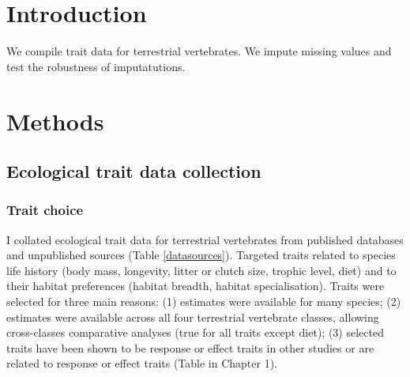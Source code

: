 \section{Introduction}
We compile trait data for terrestrial vertebrates. We impute missing values and test the robustness of imputatutions.


\section{Methods}

\subsection{Ecological trait data collection}

\subsubsection{Trait choice}
I collated ecological trait data for terrestrial vertebrates from published databases and unpublished sources (Table \ref{datasources}). Targeted traits related to species life history (body mass, longevity, litter or clutch size, trophic level, diet) and to their habitat preferences (habitat breadth, habitat specialisation). Traits were selected for three main reasons: (1) estimates were available for many species; (2) estimates were available across all four terrestrial vertebrate classes, allowing cross-classes comparative analyses (true for all traits except diet); (3) selected traits have been shown to be response or effect traits in other studies or are related to response or effect traits (Table in Chapter 1). 


